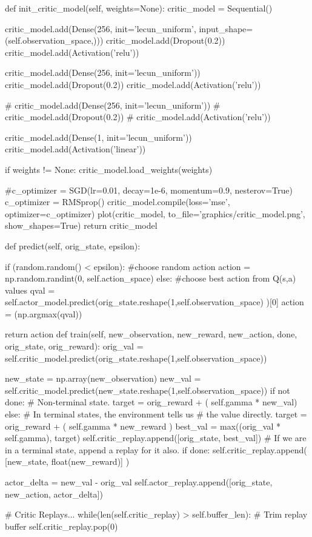 \begin{python}
def init_critic_model(self, weights=None):
critic_model = Sequential()

critic_model.add(Dense(256, init='lecun_uniform', input_shape=(self.observation_space,)))
critic_model.add(Dropout(0.2))
critic_model.add(Activation('relu'))

critic_model.add(Dense(256, init='lecun_uniform'))
critic_model.add(Dropout(0.2))
critic_model.add(Activation('relu'))

# critic_model.add(Dense(256, init='lecun_uniform'))
# critic_model.add(Dropout(0.2))
# critic_model.add(Activation('relu'))

critic_model.add(Dense(1, init='lecun_uniform'))
critic_model.add(Activation('linear'))

if weights != None:
critic_model.load_weights(weights)

#c_optimizer = SGD(lr=0.01, decay=1e-6, momentum=0.9, nesterov=True)
c_optimizer = RMSprop()
critic_model.compile(loss='mse', optimizer=c_optimizer)
plot(critic_model, to_file='graphics/critic_model.png', show_shapes=True)
return critic_model

def predict(self, orig_state, epsilon):

if (random.random() < epsilon): #choose random action
action = np.random.randint(0, self.action_space)
else: #choose best action from Q(s,a) values
qval = self.actor_model.predict(orig_state.reshape(1,self.observation_space) )[0]
action = (np.argmax(qval))

return action
def train(self, new_observation, new_reward, new_action, done, orig_state, orig_reward):
orig_val = self.critic_model.predict(orig_state.reshape(1,self.observation_space))

new_state = np.array(new_observation)
new_val = self.critic_model.predict(new_state.reshape(1,self.observation_space))
if not done: # Non-terminal state.
target = orig_reward + ( self.gamma * new_val)
else:
# In terminal states, the environment tells us
# the value directly.
target = orig_reward + ( self.gamma * new_reward )
best_val = max((orig_val * self.gamma), target)
self.critic_replay.append([orig_state, best_val])
# If we are in a terminal state, append a replay for it also.
if done:
self.critic_replay.append( [new_state, float(new_reward)] )

actor_delta = new_val - orig_val
self.actor_replay.append([orig_state, new_action, actor_delta])

# Critic Replays...
while(len(self.critic_replay) > self.buffer_len): # Trim replay buffer
self.critic_replay.pop(0)


\end{python}
